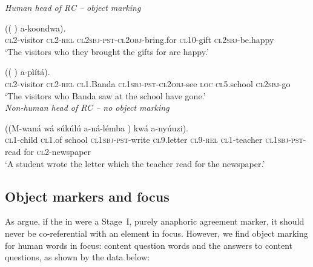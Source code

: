 \documentclass[output=paper]{LSP/langsci}
\begin{document}
{
\begin{exe}
\ex
\label{02-do-ex:23}%

\begin{xlist}

\emph{Human head of RC – object marking}

\ex \label{02-do-ex:23a}%
\gll (( 		 	 ) 	a-koondwa).\\
	 \textsc{cl2}-visitor		\textsc{cl2}-\textsc{rel} 	\textsc{cl2sbj}-\textsc{pst}-\textsc{cl2obj}-bring.for		\textsc{cl10}-gift		\textsc{cl2sbj}-be.happy\\
\glt ‘The visitors who they brought the gifts for are happy.’

\ex \label{02-do-ex:23b}%
\gll (( 	 	 		 				 	)		a-pìítá).\\
	 \textsc{cl2}-visitor	\textsc{cl2}-\textsc{rel}	\textsc{cl1}.Banda	\textsc{cl1sbj}-\textsc{pst}-\textsc{cl2obj}-see	\textsc{loc} 	\textsc{cl5}.school	\textsc{cl2sbj}-go\\
\glt ‘The visitors who Banda saw at the school have gone.’
\\
\emph{Non-human head of RC – no object marking}

\ex \label{02-do-ex:23c}%
\gll ((M-waná 	wá súkúlú 		a-ná-lémba 				  	)	kwá 	a-nyúuzi).\\
	 \textsc{cl1}-child	\textsc{cl1}.of school	\textsc{cl1sbj}-\textsc{pst}-write		\textsc{cl9}.letter \textsc{cl9}-\textsc{rel}	\textsc{cl1}-teacher \textsc{cl1sbj}-\textsc{pst}-read	for		\textsc{cl2}-newspaper\\
\glt ‘A student wrote the letter which the teacher read for the newspaper.’
\end{xlist}
\end{exe}
}

\subsection{Object markers and focus}\label{02-do-sec:3-2}

As \citet{Bresnanetal1987Topic} argue, if the  in  were a Stage~I, purely anaphoric agreement marker, it should never be co-referential with an element in focus. However, we find object marking for human words in focus: \eg content question words and the answers to content questions, as shown by the data below:
\end{document}
